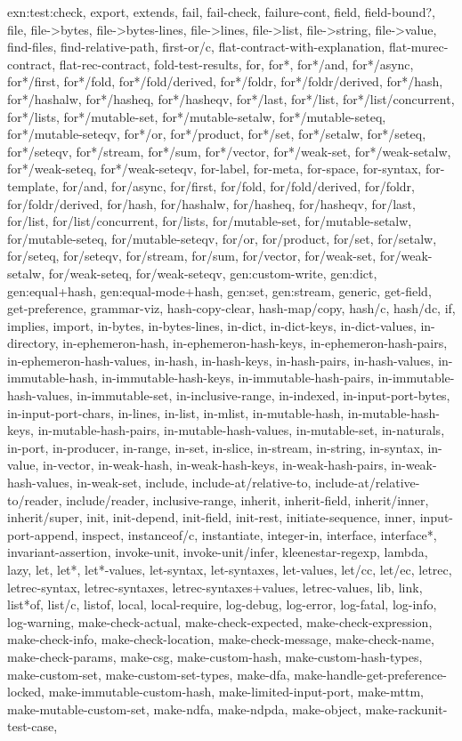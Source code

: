 {{exn:test:check, export, extends, fail, fail-check, failure-cont, field, field-bound?, file, file->bytes, file->bytes-lines, file->lines, file->list, file->string, file->value, find-files, find-relative-path, first-or/c, flat-contract-with-explanation, flat-murec-contract, flat-rec-contract, fold-test-results, for, for*, for*/and, for*/async, for*/first, for*/fold, for*/fold/derived, for*/foldr, for*/foldr/derived, for*/hash, for*/hashalw, for*/hasheq, for*/hasheqv, for*/last, for*/list, for*/list/concurrent, for*/lists, for*/mutable-set, for*/mutable-setalw, for*/mutable-seteq, for*/mutable-seteqv, for*/or, for*/product, for*/set, for*/setalw, for*/seteq, for*/seteqv, for*/stream, for*/sum, for*/vector, for*/weak-set, for*/weak-setalw, for*/weak-seteq, for*/weak-seteqv, for-label, for-meta, for-space, for-syntax, for-template, for/and, for/async, for/first, for/fold, for/fold/derived, for/foldr, for/foldr/derived, for/hash, for/hashalw, for/hasheq, for/hasheqv, for/last, for/list, for/list/concurrent, for/lists, for/mutable-set, for/mutable-setalw, for/mutable-seteq, for/mutable-seteqv, for/or, for/product, for/set, for/setalw, for/seteq, for/seteqv, for/stream, for/sum, for/vector, for/weak-set, for/weak-setalw, for/weak-seteq, for/weak-seteqv, gen:custom-write, gen:dict, gen:equal+hash, gen:equal-mode+hash, gen:set, gen:stream, generic, get-field, get-preference, grammar-viz, hash-copy-clear, hash-map/copy, hash/c, hash/dc, if, implies, import, in-bytes, in-bytes-lines, in-dict, in-dict-keys, in-dict-values, in-directory, in-ephemeron-hash, in-ephemeron-hash-keys, in-ephemeron-hash-pairs, in-ephemeron-hash-values, in-hash, in-hash-keys, in-hash-pairs, in-hash-values, in-immutable-hash, in-immutable-hash-keys, in-immutable-hash-pairs, in-immutable-hash-values, in-immutable-set, in-inclusive-range, in-indexed, in-input-port-bytes, in-input-port-chars, in-lines, in-list, in-mlist, in-mutable-hash, in-mutable-hash-keys, in-mutable-hash-pairs, in-mutable-hash-values, in-mutable-set, in-naturals, in-port, in-producer, in-range, in-set, in-slice, in-stream, in-string, in-syntax, in-value, in-vector, in-weak-hash, in-weak-hash-keys, in-weak-hash-pairs, in-weak-hash-values, in-weak-set, include, include-at/relative-to, include-at/relative-to/reader, include/reader, inclusive-range, inherit, inherit-field, inherit/inner, inherit/super, init, init-depend, init-field, init-rest, initiate-sequence, inner, input-port-append, inspect, instanceof/c, instantiate, integer-in, interface, interface*, invariant-assertion, invoke-unit, invoke-unit/infer, kleenestar-regexp, lambda, lazy, let, let*, let*-values, let-syntax, let-syntaxes, let-values, let/cc, let/ec, letrec, letrec-syntax, letrec-syntaxes, letrec-syntaxes+values, letrec-values, lib, link, list*of, list/c, listof, local, local-require, log-debug, log-error, log-fatal, log-info, log-warning, make-check-actual, make-check-expected, make-check-expression, make-check-info, make-check-location, make-check-message, make-check-name, make-check-params, make-csg, make-custom-hash, make-custom-hash-types, make-custom-set, make-custom-set-types, make-dfa, make-handle-get-preference-locked, make-immutable-custom-hash, make-limited-input-port, make-mttm, make-mutable-custom-set, make-ndfa, make-ndpda, make-object, make-rackunit-test-case, }}
